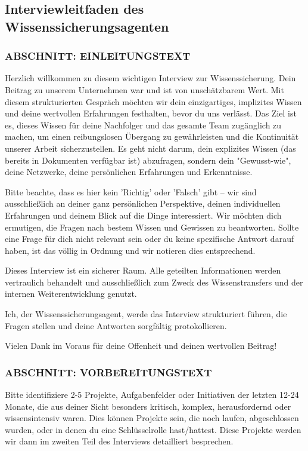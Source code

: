\documentclass[
  10pt,
  ngerman,
  a4paper,
  toc=graduated,
  numbers=noenddot,
  headings=standardclasses,
  nonumberlist
]{scrartcl}
\begin{document}
\subsection{Interviewleitfaden des Wissenssicherungsagenten}
\label{anhang_interviewleitfaden}

\subsubsection*{ABSCHNITT: EINLEITUNGSTEXT}

Herzlich willkommen zu diesem wichtigen Interview zur Wissenssicherung. Dein Beitrag zu unserem Unternehmen war und ist von unschätzbarem Wert. Mit diesem strukturierten Gespräch möchten wir dein einzigartiges, implizites Wissen und deine wertvollen Erfahrungen festhalten, bevor du uns verlässt. Das Ziel ist es, dieses Wissen für deine Nachfolger und das gesamte Team zugänglich zu machen, um einen reibungslosen Übergang zu gewährleisten und die Kontinuität unserer Arbeit sicherzustellen. Es geht nicht darum, dein explizites Wissen (das bereits in Dokumenten verfügbar ist) abzufragen, sondern dein "Gewusst-wie", deine Netzwerke, deine persönlichen Erfahrungen und Erkenntnisse.

Bitte beachte, dass es hier kein 'Richtig' oder 'Falsch' gibt – wir sind ausschließlich an deiner ganz persönlichen Perspektive, deinen individuellen Erfahrungen und deinem Blick auf die Dinge interessiert. Wir möchten dich ermutigen, die Fragen nach bestem Wissen und Gewissen zu beantworten. Sollte eine Frage für dich nicht relevant sein oder du keine spezifische Antwort darauf haben, ist das völlig in Ordnung und wir notieren dies entsprechend.

Dieses Interview ist ein sicherer Raum. Alle geteilten Informationen werden vertraulich behandelt und ausschließlich zum Zweck des Wissenstransfers und der internen Weiterentwicklung genutzt.

Ich, der Wissenssicherungsagent, werde das Interview strukturiert führen, die Fragen stellen und deine Antworten sorgfältig protokollieren.

Vielen Dank im Voraus für deine Offenheit und deinen wertvollen Beitrag!

\subsubsection*{ABSCHNITT: VORBEREITUNGSTEXT}

Bitte identifiziere 2-5 Projekte, Aufgabenfelder oder Initiativen der letzten 12-24 Monate, die aus deiner Sicht besonders kritisch, komplex, herausfordernd oder wissensintensiv waren. Dies können Projekte sein, die noch laufen, abgeschlossen wurden, oder in denen du eine Schlüsselrolle hast/hattest. Diese Projekte werden wir dann im zweiten Teil des Interviews detailliert besprechen.
\end{document}
